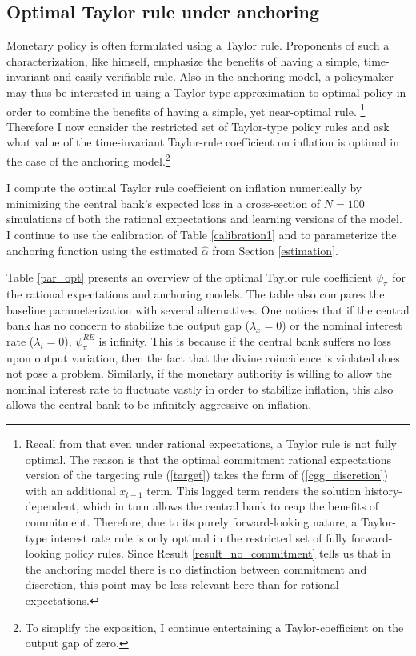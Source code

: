\documentclass[11pt]{article}
\renewcommand{\[}{\begin{equation}}
\renewcommand{\]}{\end{equation}}
\begin{document}
\subsection{Optimal Taylor rule under anchoring}\label{opt_TR}
Monetary policy is often formulated using a Taylor rule. Proponents of such a characterization, like \cite{taylor1993discretion} himself, emphasize the benefits of having a simple, time-invariant and easily verifiable rule. Also in the anchoring model, a policymaker may thus be interested in using a Taylor-type approximation to optimal policy in order to combine the benefits of having a simple, yet near-optimal rule. \footnote{Recall from \cite{woodford2011interest} that even under rational expectations, a Taylor rule is not fully optimal. The reason is that the optimal commitment rational expectations version of the targeting rule (\ref{target}) takes the form of (\ref{cgg_discretion}) with an additional $x_{t-1}$ term. This lagged term renders the solution history-dependent, which in turn allows the central bank to reap the benefits of commitment. Therefore, due to its purely forward-looking nature, a Taylor-type interest rate rule is only optimal in the restricted set of fully forward-looking policy rules. Since Result \ref{result_no_commitment} tells us that in the anchoring model there is no distinction between commitment and discretion, this point may be less relevant here than for rational expectations.} Therefore I now consider the restricted set of Taylor-type policy rules and ask what value of the time-invariant Taylor-rule coefficient on inflation is optimal in the case of the anchoring model.\footnote{To simplify the exposition, I continue entertaining a Taylor-coefficient on the output gap of zero.}

I compute the optimal Taylor rule coefficient on inflation numerically by minimizing the central bank's expected loss in a cross-section of $N=100$ simulations of both the rational expectations and learning versions of the model. I continue to use the calibration of Table \ref{calibration1} and to parameterize the anchoring function using the estimated $\hat{\alpha}$ from Section \ref{estimation}.

Table \ref{par_opt} presents an overview of the optimal Taylor rule coefficient $\psi_{\pi}$ for the rational expectations and anchoring models. The table also compares the baseline parameterization with several alternatives. One notices that if the central bank has no concern to stabilize the output gap ($\lambda_x = 0$) or the nominal interest rate ($\lambda_i =0$), $\psi_{\pi}^{RE}$ is infinity. This is because if the central bank suffers no loss upon output variation, then the fact that the divine coincidence is violated does not pose a problem. Similarly, if the monetary authority is willing to allow the nominal interest rate to fluctuate vastly in order to stabilize inflation, this also allows the central bank to be infinitely aggressive on inflation. 
\end{document}
